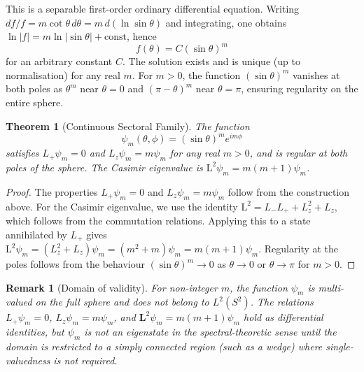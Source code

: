 \documentclass[
  aip,
  amsmath,amssymb,
  preprint
]{revtex4-1}
\newtheorem{theorem}{Theorem}[section]
\newtheorem{remark}{Remark}[section]
\begin{document}
This is a separable first-order ordinary differential equation. Writing $df/f = m\cot\theta \, d\theta = m \, d(\ln\sin\theta)$ and integrating, one obtains $\ln|f| = m\ln|\sin\theta| + \text{const}$, hence
\begin{equation}
f(\theta) = C(\sin\theta)^m
\label{eq:sectoral_solution}
\end{equation}
for an arbitrary constant $C$. The solution exists and is unique (up to normalisation) for any real $m$. For $m > 0$, the function $(\sin\theta)^m$ vanishes at both poles as $\theta^m$ near $\theta = 0$ and $(\pi-\theta)^m$ near $\theta = \pi$, ensuring regularity on the entire sphere.

\begin{theorem}[Continuous Sectoral Family]
\label{thm:sectoral}
The function
\begin{equation}
\psi_m(\theta, \phi) = (\sin\theta)^m e^{im\phi}
\label{eq:full_sectoral}
\end{equation}
satisfies $L_+ \psi_m = 0$ and $L_z \psi_m = m\psi_m$ for any real $m > 0$, and is regular at both poles of the sphere. The Casimir eigenvalue is $\mathrm{L}^2 \psi_m = m(m+1)\psi_m$.
\end{theorem}

\begin{proof}
The properties $L_+ \psi_m = 0$ and $L_z \psi_m = m\psi_m$ follow from the construction above. For the Casimir eigenvalue, we use the identity $\mathrm{L}^2 = L_- L_+ + L_z^2 + L_z$, which follows from the commutation relations. Applying this to a state annihilated by $L_+$ gives $\mathrm{L}^2 \psi_m = (L_z^2 + L_z)\psi_m = (m^2 + m)\psi_m = m(m+1)\psi_m$. Regularity at the poles follows from the behaviour $(\sin\theta)^m \to 0$ as $\theta \to 0$ or $\theta \to \pi$ for $m > 0$.
\end{proof}

\begin{remark}[Domain of validity]
\label{rem:domain}
For non-integer $m$, the function $\psi_m$ is multi-valued on the full sphere and does not belong to $L^2(S^2)$. The relations $L_+ \psi_m = 0$, $L_z \psi_m = m\psi_m$, and $\mathbf{L}^2 \psi_m = m(m+1)\psi_m$ hold as differential identities, but $\psi_m$ is not an eigenstate in the spectral-theoretic sense until the domain is restricted to a simply connected region (such as a wedge) where single-valuedness is not required.
\end{remark}
\end{document}
